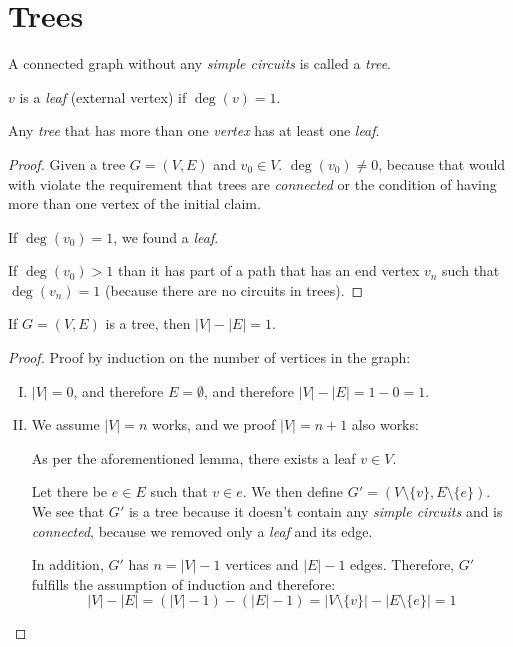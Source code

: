 \documentclass[00_complete]{subfiles}
\begin{document}
\section{Trees}
\begin{definition}[Tree]
    A connected graph without any \emph{simple circuits} is called a
    \emph{tree}.

    $v$ is a \emph{leaf} (external vertex) if $\deg(v)=1$.
\end{definition}
\begin{lemma}
    Any \emph{tree} that has more than one \emph{vertex} has at least one
    \emph{leaf}.
\end{lemma}
\begin{proof}
    Given a tree $G=(V,E)$ and $v_0 \in V$. $\deg(v_0) \neq 0$, because that
    would with violate the requirement that trees are \emph{connected} or the
    condition of having more than one vertex of the initial claim.

    If $\deg(v_0)=1$, we found a \emph{leaf}.

    If $\deg(v_0)>1$ than it has part of a path that has an end vertex $v_n$
    such that $\deg(v_n)=1$ (because there are no circuits in trees).
\end{proof}
\begin{claim}
    If $G=(V,E)$ is a tree, then $|V|-|E|=1$.
\end{claim}
\begin{proof}
   Proof by induction on the number of vertices in the graph:
   \begin{enumerate}[I.]
       \item $|V|=0$, and therefore $E = \emptyset$, and therefore
           $|V|-|E|=1-0=1$.
       \item We assume $|V|=n$ works, and we proof $|V|=n+1$ also works:

        As per the aforementioned lemma, there exists a leaf $v \in V$.

        Let there be $e \in E$ such that $v\in e$. We then define
        $G'=(V\setminus\{v\},E\setminus \{e\})$. We see that $G'$ is a tree
        because it doesn't contain any \emph{simple circuits} and is
        \emph{connected}, because we removed only a \emph{leaf} and its edge.

        In addition, $G'$ has $n=|V|-1$ vertices and $|E|-1$ edges. Therefore, $G'$
        fulfills the assumption of induction and therefore:
        $$|V|-|E|=(|V|-1)-(|E|-1)=|V\setminus\{v\}|-|E\setminus\{e\}|=1$$
   \end{enumerate}
\end{proof}
\end{document}
